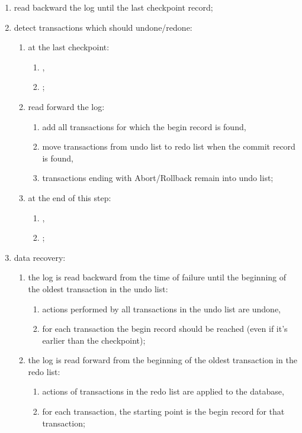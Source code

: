 \begin{enumerate}
	\item read backward the log until the last checkpoint record;
	\item detect transactions which should undone/redone:
	\begin{enumerate}
		\item at the last checkpoint:
		\begin{enumerate}
			\item {},
			\item {};
		\end{enumerate}
		\item read forward the log:
		\begin{enumerate}
			\item {} add all transactions for which the begin record is found,
			\item {} move transactions from undo list to redo list when the commit record is found,
			\item transactions ending with Abort/Rollback remain into undo list;
		\end{enumerate}
		\item at the end of this step:
		\begin{enumerate}
			\item {},
			\item {};
		\end{enumerate}
	\end{enumerate}
	\item data recovery:
	\begin{enumerate}
		\item the log is read backward from the time of failure until the beginning of the oldest transaction in the undo list:
		\begin{enumerate}
			\item actions performed by all transactions in the undo list are undone,
			\item for each transaction the begin record should be reached (even if it's earlier than the checkpoint);
		\end{enumerate}
		\item the log is read forward from the beginning of the oldest transaction in the redo list:
		\begin{enumerate}
			\item actions of transactions in the redo list are applied to the database,
			\item for each transaction, the starting point is the begin record for that transaction; 
		\end{enumerate}
	\end{enumerate}
\end{enumerate}
